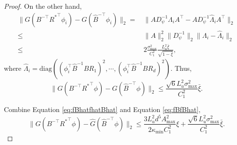 \begin{proof}
On the other hand, 
\begin{align*}
\|G(B^{-\top}{R^*}^{\top}\phi_i) - G(\hat{B}^{-\top}\phi_i)\|_2 
= & \, \|A D_{\psi}^{-1}\Lambda_iA^{\top}- A D_{\psi}^{-1}\hat{\Lambda}_iA^{\top}\|_2 \\
\le & \, \|A\|^2_2 \|D_{\psi}^{-1}\|_2 \|\Lambda_i - \hat{\Lambda}_i\|_2\\
\le & \, 2\frac{\sigma_{\max}^2}{C_1^2}\frac{L_u^2\bar{\xi}}{\sqrt{1-\bar{\xi}}},
\end{align*}
where $\hat{\Lambda}_i = \text{diag}\left((\phi_i^{\top}\hat{B}^{-1}BR_1)^2, \cdots, (\phi_i^{\top}\hat{B}^{-1}BR_d)^2\right)$.
Thus,
\begin{equation}
\label{eq:fBfBhat}
\|G(B^{-\top}{R^*}^{\top}\phi) - G(\hat{B}^{-\top}\phi)\|_2 \le  \frac{\sqrt{6}L_u^2\sigma_{\max}^2}{C_1^2}\bar{\xi}. 
\end{equation}

Combine Equation \eqref{eq:fBhatfhatBhat} and Equation \eqref{eq:fBfBhat},
\[
\|G(B^{-\top}{R^*}^{\top}\phi) - \hat{G}(\hat{B}^{-\top}\phi)\|_2
\le 
\frac{3L_u^2d^5A^2_{\max}}{2\kappa_{\min}C_1^2}\xi + \frac{\sqrt{6}L_u^2\sigma_{\max}^2}{C_1^2}\bar{\xi}.
\]
\end{proof}

